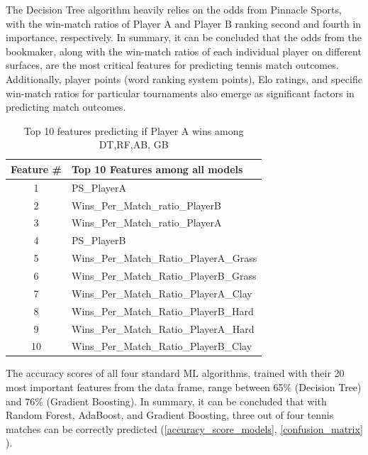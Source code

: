 %
The Decision Tree algorithm heavily relies on the odds from Pinnacle Sports, with the win-match ratios of Player A and Player B ranking second and fourth in importance, respectively.
In summary, it can be concluded that the odds from the bookmaker, along with the win-match ratios of each individual player on different surfaces, are the most critical features for predicting tennis match outcomes. Additionally, player points (word ranking system points), Elo ratings, and specific win-match ratios for particular tournaments also emerge as significant factors in predicting match outcomes.

\begin{table}[h]
\centering
\caption{Top 10 features predicting if Player A wins among DT,RF,AB, GB}
\begin{tabular}{|c|l|}
\hline
\textbf{Feature \#} & \textbf{Top 10 Features among all models} \\
\hline
1 & PS\_PlayerA \\
2 & Wins\_Per\_Match\_ratio\_PlayerB \\
3 & Wins\_Per\_Match\_ratio\_PlayerA \\
4 & PS\_PlayerB \\
5 & Wins\_Per\_Match\_Ratio\_PlayerA\_Grass \\
6 & Wins\_Per\_Match\_Ratio\_PlayerB\_Grass \\
7 & Wins\_Per\_Match\_Ratio\_PlayerA\_Clay \\
8 & Wins\_Per\_Match\_Ratio\_PlayerB\_Hard \\
9 & Wins\_Per\_Match\_Ratio\_PlayerA\_Hard \\
10 & Wins\_Per\_Match\_Ratio\_PlayerB\_Clay \\
\hline
\end{tabular}
\end{table}

The accuracy scores of all four standard ML algorithms, trained with their 20 most important features from the data frame, range between 65\% (Decision Tree) and 76\% (Gradient Boosting). In summary, it can be concluded that with Random Forest, AdaBoost, and Gradient Boosting, three out of four tennis matches can be correctly predicted (\ref{accuracy_score_models}, \ref{confusion_matrix} ).

